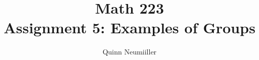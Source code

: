 


% 
% 

 
\title{Math 223 \\
Assignment 5: Examples of Groups
}
\author{Quinn Neumiiller}
 
\maketitle


